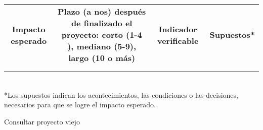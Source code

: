 \begin{ideas}
\begin{tabular}{|c|c|c|c|}\hline
   \textbf{\parbox[t]{2cm}{\textbf{Impacto esperado}}}&\parbox[c]{4cm}{\textbf{Plazo (a nos) después de finalizado el proyecto: corto (1-4 ), mediano (5-9), largo (10 o más)}} & \textbf{\parbox[t]{2cm}{\textbf{Indicador verificable}}} &\textbf{Supuestos*}\\
   & & &\\\hline 
   & & &\\\hline
 \end{tabular}\\
*Los supuestos indican los acontecimientos, las condiciones o las decisiones,
necesarios para que se logre el impacto esperado.


Consultar proyecto viejo
\end{ideas}




